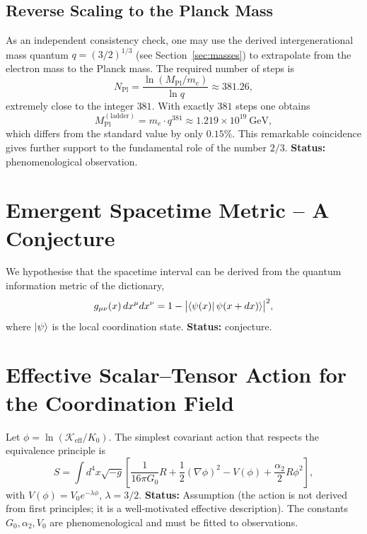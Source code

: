 \documentclass[12pt,a4paper]{article}
\newcommand{\Mpl}{M_{\mathrm{Pl}}}
\begin{document}
	\subsection{Reverse Scaling to the Planck Mass}
	As an independent consistency check, one may use the derived intergenerational mass quantum \(q = (3/2)^{1/3}\) (see Section~\ref{sec:masses}) to extrapolate from the electron mass to the Planck mass. The required number of steps is
	\[
	N_{\mathrm{Pl}} = \frac{\ln(\Mpl/m_e)}{\ln q} \approx 381.26,
	\]
	extremely close to the integer \(381\). With exactly \(381\) steps one obtains
	\[
	\Mpl^{\mathrm{(ladder)}} = m_e \cdot q^{381} \approx 1.219\times10^{19}\ \mathrm{GeV},
	\]
	which differs from the standard value by only \(0.15\%\). This remarkable coincidence gives further support to the fundamental role of the number \(2/3\). \textbf{Status:} phenomenological observation.
	
	\section{Emergent Spacetime Metric -- A Conjecture}
	\label{sec:metric}
	We hypothesise that the spacetime interval can be derived from the quantum information metric of the dictionary,
	\[
	g_{\mu\nu}(x) \, dx^\mu dx^\nu = 1 - \bigl| \bra{\psi(x)} \psi(x+dx) \rangle \bigr|^2,
	\]
	where \(\ket{\psi}\) is the local coordination state. \textbf{Status:} conjecture.
	
	\section{Effective Scalar--Tensor Action for the Coordination Field}
	\label{sec:action}
	Let \(\phi = \ln(\mathcal{K}_{\mathrm{eff}}/K_0)\). The simplest covariant action that respects the equivalence principle is
	\begin{equation}
		S = \int d^4x\sqrt{-g}\left[ \frac{1}{16\pi G_0} R + \frac12(\nabla\phi)^2 - V(\phi) + \frac{\alpha_2}{2}R\phi^2 \right],
		\label{eq:action}
	\end{equation}
	with \(V(\phi) = V_0 e^{-\lambda\phi}\), \(\lambda = 3/2\). \textbf{Status:} Assumption (the action is not derived from first principles; it is a well‑motivated effective description). The constants \(G_0, \alpha_2, V_0\) are phenomenological and must be fitted to observations.
	
\end{document}

